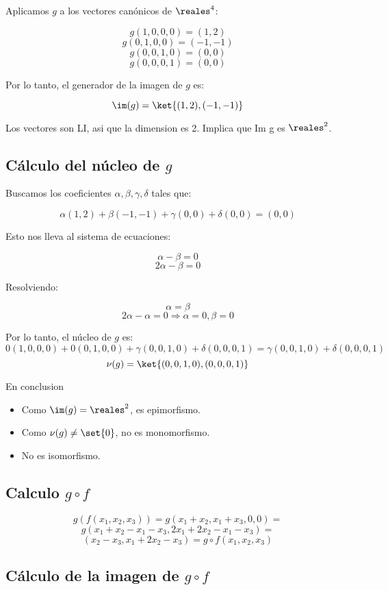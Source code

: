Aplicamos $g$ a los vectores canónicos de $\reales^4$:

$$ g(1,0,0,0) = (1,2) $$
$$ g(0,1,0,0) = (-1,-1) $$
$$ g(0,0,1,0) = (0,0) $$
$$ g(0,0,0,1) = (0,0) $$

Por lo tanto, el generador de la imagen de $ g $ es:

$$ \im(g) = \ket{(1,2), (-1,-1)} $$

Los vectores son LI, asi que la dimension es 2. Implica que Im g es $ \reales^2 $.

\subsection*{Cálculo del núcleo de $ g $}

Buscamos los coeficientes $ \alpha, \beta, \gamma, \delta $ tales que:

$$ \alpha(1,2) + \beta(-1,-1) + \gamma(0,0) + \delta(0,0) = (0,0) $$

Esto nos lleva al sistema de ecuaciones:

$$ \alpha - \beta = 0 $$
$$ 2\alpha - \beta = 0 $$

Resolviendo:

$$ \alpha = \beta $$
$$ 2\alpha - \alpha = 0 \Rightarrow \alpha = 0, \beta = 0 $$

Por lo tanto, el núcleo de $ g $ es:
$$ 0(1,0,0,0) + 0(0,1,0,0) + \gamma(0,0,1,0) + \delta(0,0,0,1) = \gamma(0,0,1,0) + \delta(0,0,0,1) $$
$$ \nu(g) = \ket{(0,0,1,0), (0,0,0,1)} $$

En conclusion

\begin{itemize}
  \item Como $ \im(g) = \reales^2 $, es epimorfismo.
  \item Como $ \nu(g) \neq \set{0} $, no es monomorfismo.
  \item No es isomorfismo.
\end{itemize}

\subsection*{Calculo $ g\circ f $}
$$ g(f(x_1,x_2,x_3)) = g(x_1+x_2,x_1+x_3,0,0) =$$
$$ g(x_1+x_2-x_1-x_3,2x_1+2x_2-x_1-x_3) =   $$
$$ (x_2-x_3,x_1+2x_2-x_3) = g\circ f (x_1,x_2,x_3) $$

\subsection*{Cálculo de la imagen de $ g\circ f $}


